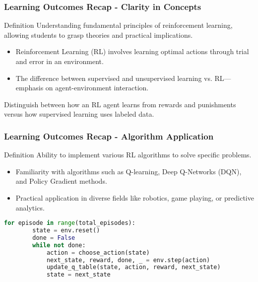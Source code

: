 \documentclass[aspectratio=169]{beamer}
\begin{document}
\begin{frame}[fragile]
    \frametitle{Learning Outcomes Recap - Clarity in Concepts}
    \begin{block}{Definition}
        Understanding fundamental principles of reinforcement learning, allowing students to grasp theories and practical implications.
    \end{block}

    \begin{itemize}
        \item Reinforcement Learning (RL) involves learning optimal actions through trial and error in an environment.
        \item The difference between supervised and unsupervised learning vs. RL—emphasis on agent-environment interaction.
    \end{itemize}

    \begin{example}
        Distinguish between how an RL agent learns from rewards and punishments versus how supervised learning uses labeled data.
    \end{example}
\end{frame}

\begin{frame}[fragile]
    \frametitle{Learning Outcomes Recap - Algorithm Application}
    \begin{block}{Definition}
        Ability to implement various RL algorithms to solve specific problems.
    \end{block}

    \begin{itemize}
        \item Familiarity with algorithms such as Q-learning, Deep Q-Networks (DQN), and Policy Gradient methods.
        \item Practical application in diverse fields like robotics, game playing, or predictive analytics.
    \end{itemize}

    \begin{lstlisting}[language=Python]
    for episode in range(total_episodes):
        state = env.reset()
        done = False
        while not done:
            action = choose_action(state)
            next_state, reward, done, _ = env.step(action)
            update_q_table(state, action, reward, next_state)
            state = next_state
    \end{lstlisting}
\end{frame}
\end{document}
